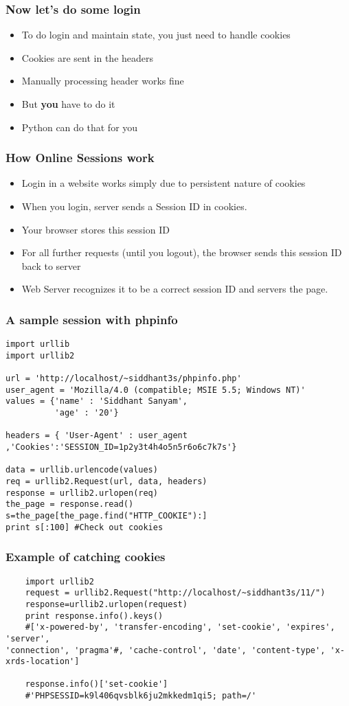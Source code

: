 \documentclass{beamer}
\begin{document}
\begin{frame}
\frametitle{Now let's do some login}
\label{sec-9_9}


\begin{itemize}
\item To do login and maintain state, you just need to handle cookies
\item Cookies are sent in the headers
\item Manually processing header works fine
\item But \textbf{you} have to do it
\item Python can do that for you
\end{itemize}
\end{frame}
\begin{frame}
\frametitle{How Online Sessions work}
\label{sec-9_10}


\begin{itemize}
\item Login in a website works simply due to persistent nature of cookies
\item When you login, server sends a Session ID in cookies.
\item Your browser stores this session ID
\item For all further requests (until you logout), the browser sends this session ID back to server
\item Web Server recognizes it to be a correct session ID and servers the page.
\end{itemize}
\end{frame}
\begin{frame}[fragile]
\frametitle{A sample session with phpinfo}
\label{sec-9_11}

\begin{verbatim}
import urllib
import urllib2

url = 'http://localhost/~siddhant3s/phpinfo.php'
user_agent = 'Mozilla/4.0 (compatible; MSIE 5.5; Windows NT)'
values = {'name' : 'Siddhant Sanyam',
          'age' : '20'}

headers = { 'User-Agent' : user_agent ,'Cookies':'SESSION_ID=1p2y3t4h4o5n5r6o6c7k7s'}

data = urllib.urlencode(values)
req = urllib2.Request(url, data, headers)
response = urllib2.urlopen(req)
the_page = response.read()
s=the_page[the_page.find("HTTP_COOKIE"):]
print s[:100] #Check out cookies
\end{verbatim}
\end{frame}
\begin{frame}[fragile]
\frametitle{Example of catching cookies}
\label{sec-9_12}

\begin{verbatim}
    import urllib2
    request = urllib2.Request("http://localhost/~siddhant3s/11/")
    response=urllib2.urlopen(request)
    print response.info().keys()
    #['x-powered-by', 'transfer-encoding', 'set-cookie', 'expires', 'server',
'connection', 'pragma'#, 'cache-control', 'date', 'content-type', 'x-xrds-location']
    
    response.info()['set-cookie']
    #'PHPSESSID=k9l406qvsblk6ju2mkkedm1qi5; path=/'
\end{verbatim}
   
\end{frame}
\end{document}
